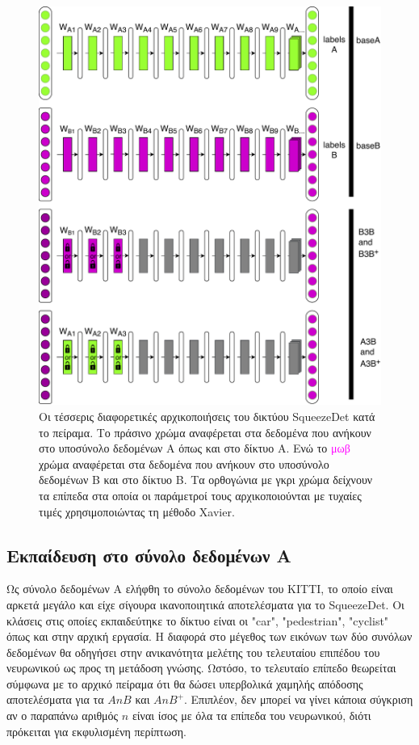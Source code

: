 \begin{figure}
\centering
\includegraphics[width = \textwidth]{figures/experiments/tl_exp_config.pdf}
\caption[Οι τέσσερις διαφορετικές αρχικοποιήσεις του δικτύου]{Οι τέσσερις διαφορετικές αρχικοποιήσεις του δικτύου SqueezeDet κατά το πείραμα. Το \textcolor{myGreen}{πράσινο} χρώμα αναφέρεται στα δεδομένα που ανήκουν στο υποσύνολο δεδομένων A όπως και στο δίκτυο A. Ενώ το \textcolor{magenta}{μωβ} χρώμα αναφέρεται στα δεδομένα που ανήκουν στο υποσύνολο δεδομένων B και στο δίκτυο B. Τα ορθογώνια με \textcolor{myGrey}{γκρι} χρώμα δείχνουν τα επίπεδα στα οποία οι παράμετροί τους αρχικοποιούνται με τυχαίες τιμές χρησιμοποιώντας τη μέθοδο Xavier.}
\label{fig:tl_exp_config}
\end{figure}

\subsection{Εκπαίδευση στο σύνολο δεδομένων A}
\label{subsection:Atrain}
Ως σύνολο δεδομένων Α ελήφθη το σύνολο δεδομένων του KITTI, το οποίο είναι αρκετά μεγάλο και είχε σίγουρα ικανοποιητικά αποτελέσματα για το SqueezeDet. Οι κλάσεις στις οποίες εκπαιδεύτηκε το δίκτυο είναι οι "car", "pedestrian", "cyclist" όπως και στην αρχική εργασία. Η διαφορά στο μέγεθος των εικόνων των δύο συνόλων δεδομένων θα οδηγήσει στην ανικανότητα μελέτης του τελευταίου επιπέδου του νευρωνικού ως προς τη μετάδοση γνώσης. Ωστόσο, το τελευταίο επίπεδο θεωρείται σύμφωνα με το αρχικό πείραμα ότι θα δώσει υπερβολικά χαμηλής απόδοσης αποτελέσματα για τα $AnB$ και $AnB^+$. Επιπλέον, δεν μπορεί να γίνει κάποια σύγκριση αν ο παραπάνω αριθμός $n$ είναι ίσος με όλα τα επίπεδα του νευρωνικού, διότι πρόκειται για εκφυλισμένη περίπτωση.

